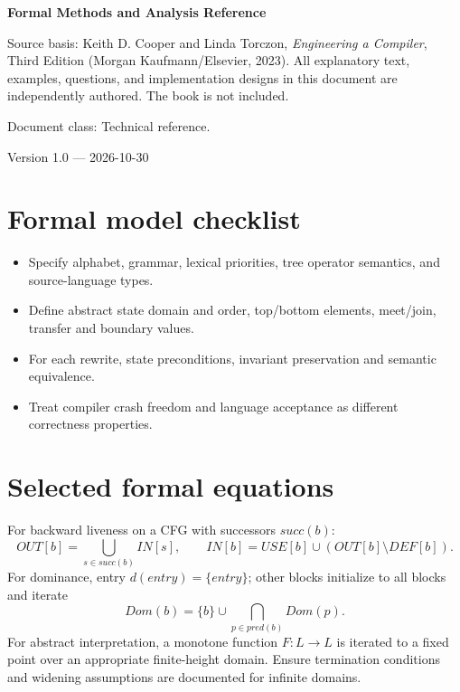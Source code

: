 \documentclass[10pt,letterpaper]{article}
\begin{document}
\begin{titlepage}
\centering\vspace*{1.0in}
{\Huge\bfseries\textcolor{CompilerBlue}{Formal Methods and Analysis Reference}\par}
\vspace{.22in}{\Large Finite automata, CFG fixed points and legality proofs\par}
\vspace{.4in}{\large Compiler Engineering Documentation Suite\par}
\vfill
\begin{minipage}{.86\linewidth}\small
Source basis: Keith D. Cooper and Linda Torczon, \emph{Engineering a Compiler}, Third Edition (Morgan Kaufmann/Elsevier, 2023). All explanatory text, examples, questions, and implementation designs in this document are independently authored. The book is not included.\par\medskip
Document class: Technical reference.
\end{minipage}
\vfill\textcolor{CompilerGray}{Version 1.0 --- 2026-10-30}\par
\end{titlepage}
\tableofcontents\clearpage
\section{Formal model checklist}
\begin{itemize}
\item Specify alphabet, grammar, lexical priorities, tree operator semantics, and source-language types.
\item Define abstract state domain and order, top/bottom elements, meet/join, transfer and boundary values.
\item For each rewrite, state preconditions, invariant preservation and semantic equivalence.
\item Treat compiler crash freedom and language acceptance as different correctness properties.
\end{itemize}

\section{Selected formal equations}
For backward liveness on a CFG with successors $succ(b)$:
\[
 OUT[b]=\bigcup_{s\in succ(b)}IN[s],\qquad
 IN[b]=USE[b]\cup(OUT[b]\setminus DEF[b]).
\]
For dominance, entry $d(entry)=\{entry\}$; other blocks initialize to all blocks and iterate
\[
 Dom(b)=\{b\}\cup\bigcap_{p\in pred(b)}Dom(p).
\]
For abstract interpretation, a monotone function $F:L\to L$ is iterated to a fixed point over an appropriate finite-height domain. Ensure termination conditions and widening assumptions are documented for infinite domains.
\end{document}
